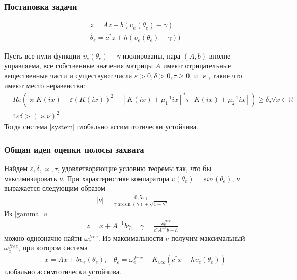 \documentclass{beamer}
\begin{document}
\begin{frame}
\frametitle{Постановка задачи}
 \begin{equation}\label{system}
 \begin{aligned}
 &\dot{z} = Az + b(\upsilon_e(\theta_e) - \gamma) \\
 & \dot{\theta_e} = c^*z + h(\upsilon_e(\theta_e) - \gamma))
 \end{aligned}
\end{equation}
\begin{theorem}
Пусть все нули функции $\upsilon_e(\theta_e) - \gamma$ изолированы, пара $(A, b)$ вполне управляема, все собственные значения матрицы $A$ имеют отрицательные вещественные части и существуют числа $\varepsilon > 0, \delta > 0, \tau \geq 0$, и $\varkappa$, такие что имеют место неравенства:
 \begin{align}
&Re(\varkappa K(ix)- \varepsilon(K(ix))^2-[K(ix)+\mu_1^{-1}ix]^*\tau[K(ix)+\mu_2^{-1}ix])\geq\delta\text{,}\forall x \in \mathbb{R}\label{first_th_eq}\\
&4\varepsilon\delta > (\varkappa\nu)^2
\end{align}
Тогда система \eqref{system} глобально ассимптотически устойчива.
\end{theorem}
\end{frame}



\begin{frame}
\frametitle{Общая идея оценки полосы захвата}
Найдем $\varepsilon, \delta, \varkappa, \tau$, удовлетворяющие условию теоремы так, что бы максимизировать $\nu$. При характеристике компаратора $\upsilon(\theta_e) = sin(\theta_e)$, $\nu$ выражается следующим образом
 \begin{equation}\label{gamma}
 \begin{aligned}
\mid\nu\mid = \frac{0,5\pi\gamma}{\gamma \operatorname{arcsin} (\gamma) + \sqrt{1-\gamma^2}}
 \end{aligned}
\end{equation}
Из \eqref{gamma} и 
 \begin{equation}
 \begin{aligned}
 z = x + A^{-1}b\gamma  \text{,} \quad \gamma = \frac{\omega_e^{free}}{c^*A^{-1}b-h}
 \end{aligned}
\end{equation}
 можно однозначно найти $\omega_e^{free}$. Из максимальности $\nu$ получим максимальный $\omega_e^{free}$, при котором система 
 \begin{equation*}
 \begin{aligned}
 &\dot{x} = Ax + b\upsilon_e(\theta_e)\text{,} \quad \dot{\theta}_e = \omega_e^{free} - K_{vco}(c^*x + h\upsilon_e(\theta_e))
 \end{aligned}
\end{equation*} 
глобально ассимтотически устойчива.
\end{frame}
\end{document}
